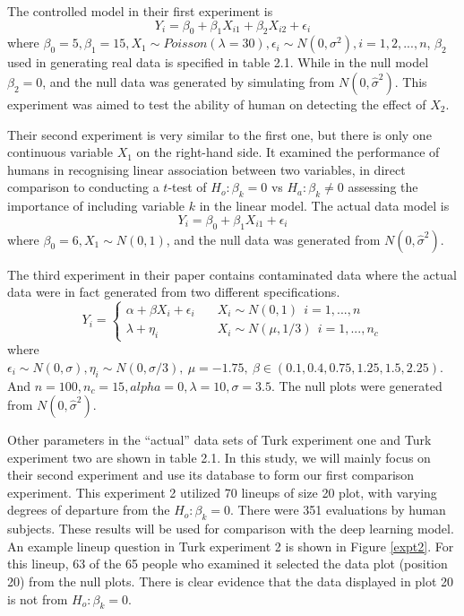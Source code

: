 \documentclass[12pt]{article}
\begin{document}
The controlled model in their first experiment is
\[Y_i=\beta_0+\beta_1 X_{i1}+\beta_2 X_{i2}+\epsilon_i\] where
\(\beta_0=5, \beta_1=15, X_1 \sim Poisson(\lambda=30), \epsilon_i\sim N(0,\sigma^2), i=1,2,...,n\),
\(\beta_2\) used in generating real data is specified in table 2.1.
While in the null model \(\beta_2=0\), and the null data was generated
by simulating from \(N(0,\hat{\sigma}^2)\). This experiment was aimed to
test the ability of human on detecting the effect of \(X_2\).

Their second experiment is very similar to the first one, but there is
only one continuous variable \(X_1\) on the right-hand side. It examined
the performance of humans in recognising linear association between two
variables, in direct comparison to conducting a \(t\)-test of
\(H_o: \beta_k=0\) vs \(H_a: \beta_k\neq 0\) assessing the importance of
including variable \(k\) in the linear model. The actual data model is
\[Y_i=\beta_0+\beta_1 X_{i1}+\epsilon_i\] where
\(\beta_0=6, X_1\sim N(0,1)\), and the null data was generated from
\(N(0, \hat{\sigma}^2)\).

The third experiment in their paper contains contaminated data where the
actual data were in fact generated from two different specifications.
\[Y_i=
  \begin{cases}
    \alpha+\beta X_i+\epsilon_i       & \quad X_i\sim N(0,1)\ \ i=1,...,n\\
    \lambda+\eta_i  & \quad X_i\sim N(\mu,1/3)\ \ i=1,...,n_c
  \end{cases}
\] where
\(\epsilon_i \sim N(0,\sigma), \eta_i \sim N(0,\sigma/3), \ \mu=-1.75, \ \beta\in(0.1, 0.4, 0.75, 1.25, 1.5, 2.25)\).
And \(n=100, n_c=15, alpha=0, \lambda=10, \sigma=3.5\). The null plots
were generated from \(N(0,\hat{\sigma}^2)\).

Other parameters in the ``actual'' data sets of Turk experiment one and
Turk experiment two are shown in table 2.1. In this study, we will
mainly focus on their second experiment and use its database to form our
first comparison experiment. This experiment 2 utilized 70 lineups of
size 20 plot, with varying degrees of departure from the
\(H_o: \beta_k=0\). There were 351 evaluations by human subjects. These
results will be used for comparison with the deep learning model. An
example lineup question in Turk experiment 2 is shown in Figure
\ref{expt2}. For this lineup, 63 of the 65 people who examined it
selected the data plot (position 20) from the null plots. There is clear
evidence that the data displayed in plot 20 is not from
\(H_o: \beta_k=0\).
\end{document}
